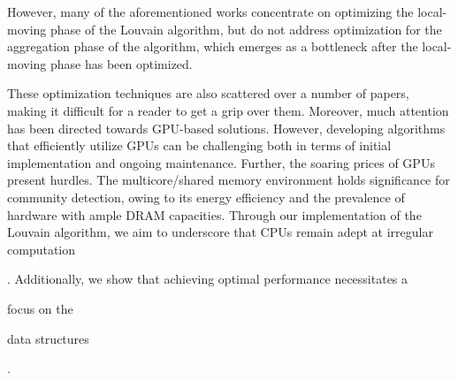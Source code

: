 However, many of the aforementioned works concentrate on optimizing the local-moving phase of the Louvain algorithm, but do not address optimization for the aggregation phase of the algorithm, which emerges as a bottleneck after the local-moving phase has been optimized. These optimization techniques are also scattered over a number of papers, making it difficult for a reader to get a grip over them. Moreover, much attention has been directed towards GPU-based solutions. However, developing algorithms that efficiently utilize GPUs can be challenging both in terms of initial implementation and ongoing maintenance. Further, the soaring prices of GPUs present hurdles. The multicore/shared memory environment holds significance for community detection, owing to its energy efficiency and the prevalence of hardware with ample DRAM capacities. Through our implementation of the Louvain algorithm, we aim to underscore that CPUs remain adept at irregular computation. Additionally, we show that achieving optimal performance necessitates a focus on the data structures.


